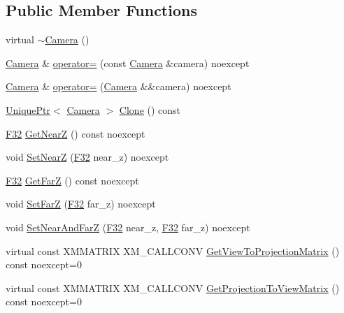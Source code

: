 \subsection*{Public Member Functions}
\begin{DoxyCompactItemize}
\item 
virtual \hyperlink{classmage_1_1_camera_aa4718c93578d160299bdc24039cc256f}{$\sim$\+Camera} ()
\item 
\hyperlink{classmage_1_1_camera}{Camera} \& \hyperlink{classmage_1_1_camera_a785b5e3a62922f7a687ffcaecd0ef89c}{operator=} (const \hyperlink{classmage_1_1_camera}{Camera} \&camera) noexcept
\item 
\hyperlink{classmage_1_1_camera}{Camera} \& \hyperlink{classmage_1_1_camera_ac52101822e004915a96150305564a6bf}{operator=} (\hyperlink{classmage_1_1_camera}{Camera} \&\&camera) noexcept
\item 
\hyperlink{namespacemage_a3316d7143a973e37adf1110f2e80ca31}{Unique\+Ptr}$<$ \hyperlink{classmage_1_1_camera}{Camera} $>$ \hyperlink{classmage_1_1_camera_a830e9a071449f1026fd43fcd19577e6c}{Clone} () const
\item 
\hyperlink{namespacemage_aa97e833b45f06d60a0a9c4fc22ae02c0}{F32} \hyperlink{classmage_1_1_camera_add4054d66911dd183cdec85eda77b4a1}{Get\+NearZ} () const noexcept
\item 
void \hyperlink{classmage_1_1_camera_a404c336596263f7b55f4ff2e5097f8e9}{Set\+NearZ} (\hyperlink{namespacemage_aa97e833b45f06d60a0a9c4fc22ae02c0}{F32} near\+\_\+z) noexcept
\item 
\hyperlink{namespacemage_aa97e833b45f06d60a0a9c4fc22ae02c0}{F32} \hyperlink{classmage_1_1_camera_a47e6801d228891453540b0c1e787724a}{Get\+FarZ} () const noexcept
\item 
void \hyperlink{classmage_1_1_camera_aa49995ef824eeb807656921406d248a5}{Set\+FarZ} (\hyperlink{namespacemage_aa97e833b45f06d60a0a9c4fc22ae02c0}{F32} far\+\_\+z) noexcept
\item 
void \hyperlink{classmage_1_1_camera_aa075b0f6f30376217c0058a70df9d845}{Set\+Near\+And\+FarZ} (\hyperlink{namespacemage_aa97e833b45f06d60a0a9c4fc22ae02c0}{F32} near\+\_\+z, \hyperlink{namespacemage_aa97e833b45f06d60a0a9c4fc22ae02c0}{F32} far\+\_\+z) noexcept
\item 
virtual const X\+M\+M\+A\+T\+R\+IX X\+M\+\_\+\+C\+A\+L\+L\+C\+O\+NV \hyperlink{classmage_1_1_camera_a716d842481321b8b4d71da45ab77a7c9}{Get\+View\+To\+Projection\+Matrix} () const noexcept=0
\item 
virtual const X\+M\+M\+A\+T\+R\+IX X\+M\+\_\+\+C\+A\+L\+L\+C\+O\+NV \hyperlink{classmage_1_1_camera_a9259dee9eeee754a1392cca88f428d29}{Get\+Projection\+To\+View\+Matrix} () const noexcept=0

\end{DoxyCompactItemize}
